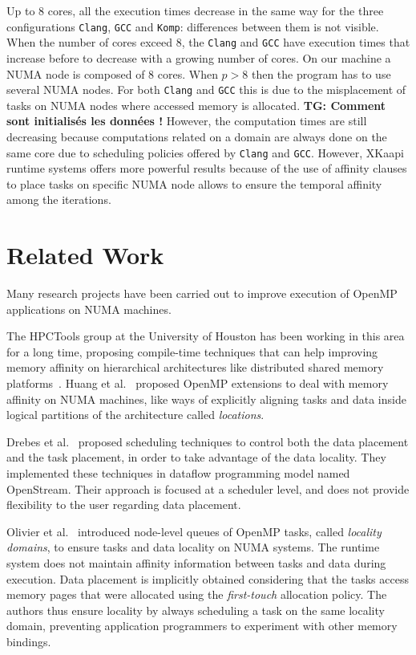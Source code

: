 \documentclass{Styles/llncs}
\newcommand{\TG}[1]{{\color{red}\bfseries TG: #1}}
\begin{document}
Up to 8 cores, all the execution times decrease in the same way for the three configurations \texttt{Clang}, \texttt{GCC} and \texttt{Komp}: differences between them is not visible.
When the number of cores exceed $8$, the \texttt{Clang} and \texttt{GCC} have execution times that increase before to decrease with a growing number of cores.
On our machine a NUMA node is composed of $8$ cores. When $p >8$ then the program has to use several NUMA nodes. For both \texttt{Clang} and \texttt{GCC} this is due to the misplacement of tasks on NUMA nodes where accessed memory is allocated.
\TG{Comment sont initialisés les données !}
However, the computation times are still decreasing because computations related on a domain are always done on the same core due to scheduling policies offered by \texttt{Clang} and \texttt{GCC}.
However, XKaapi runtime systems offers more powerful results because of the use of affinity clauses to place tasks on specific NUMA node allows to ensure the temporal affinity among the iterations.


\section{Related Work}
\label{sec:related_work}

Many research projects have been carried out to improve execution of
OpenMP applications on NUMA machines.

The HPCTools group at the University of Houston has been working in
this area for a long time, proposing compile-time techniques that can
help improving memory affinity on hierarchical architectures like
distributed shared memory
platforms~\cite{Marowka:2004:OAD:1064428.1064431}. Huang et
al.~\cite{Huang-Chapman-locality-OpenMP} proposed OpenMP extensions to
deal with memory affinity on NUMA machines, like ways of explicitly
aligning tasks and data inside logical partitions of the architecture
called \textit{locations}.


Drebes et al.~\cite{Drebes:2014:TDS:2658949.2641764} proposed scheduling
techniques to control both the data placement and the task placement, in order to
take advantage of the data locality. They implemented these techniques
in dataflow programming model named OpenStream.
Their approach is focused at a scheduler level, and does not provide
flexibility to the user regarding data placement.

Olivier et
al.~\cite{Olivier:2012:CMW:2388996.2389085}
introduced node-level queues of OpenMP tasks, called \textit{locality
  domains}, to ensure tasks and data locality on NUMA systems. The
runtime system does not maintain affinity information between tasks
and data during execution. Data placement is implicitly obtained
considering that the tasks access memory pages that were allocated
using the \textit{first-touch} allocation policy. The authors thus
ensure locality by always scheduling a task on the same locality
domain, preventing application programmers to experiment with other
memory bindings.
\end{document}
